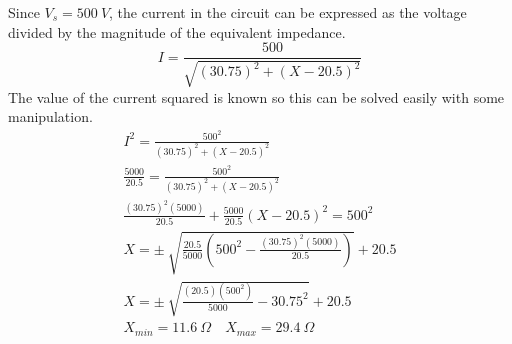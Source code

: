 \documentclass[12pt]{article}
\begin{document}
    Since $V_{s} = 500\ V$, the current in the circuit can be expressed as the
    voltage divided by the magnitude of the equivalent impedance.
    \[
        I = \frac{500}{\sqrt{(30.75)^2 + (X - 20.5)^2}}
    \]
    The value of the current squared is known so this can be solved easily with
    some manipulation.
    \begin{gather*}
        I^2 = \frac{500^2}{(30.75)^2 + (X - 20.5)^2} \\
        \frac{5000}{20.5} = \frac{500^2}{(30.75)^2 + (X - 20.5)^2} \\
        \frac{(30.75)^2(5000)}{20.5} + \frac{5000}{20.5} (X - 20.5)^2 = 500^2 \\
        X = \pm\ \sqrt{\frac{20.5}{5000}\left( 500^2 -
        \frac{(30.75)^2(5000)}{20.5} \right) } + 20.5 \\
        X = \pm\ \sqrt{\frac{(20.5)(500^2)}{5000} - 30.75^2} + 20.5 \\
        \boxed{X_{min} = 11.6\ \Omega \quad X_{max} = 29.4\ \Omega}
    \end{gather*}
\end{document}
